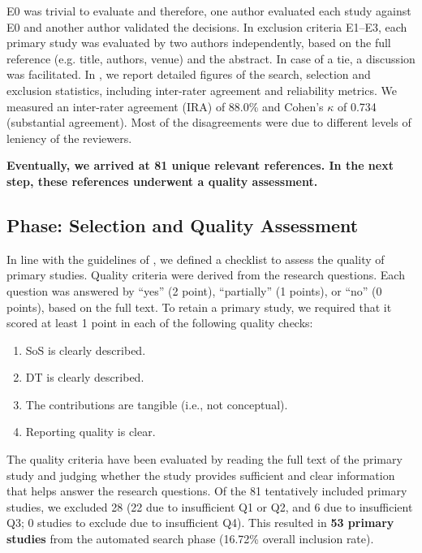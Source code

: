 E0 was trivial to evaluate and therefore, one author evaluated each study against E0 and another author validated the decisions. In exclusion criteria E1--E3, each primary study was evaluated by two authors independently, based on the full reference (e.g. title, authors, venue) and the abstract. In case of a tie, a discussion was facilitated. In , we report detailed figures of the search, selection and exclusion statistics, including inter-rater agreement and reliability metrics.
We measured an inter-rater agreement (IRA) of 88.0\% and Cohen's $\kappa$ of 0.734 (substantial agreement). Most of the disagreements were due to different levels of leniency of the reviewers.

\textbf{Eventually, we arrived at 81 unique relevant references. In the next step, these references underwent a quality assessment.}



\subsection{Phase: Selection and Quality Assessment}\label{subsec:literature-review-study-phases-selection}
In line with the guidelines of \citet{kitchenham2007guidelines}, we defined a checklist to assess the quality of primary studies. Quality criteria were derived from the research questions. Each question was answered by ``yes'' (2 point), ``partially'' (1 points), or ``no'' (0 points), based on the full text. To retain a primary study, we required that it scored at least 1 point in each of the following quality checks:

\begin{enumerate}[\bfseries{Q}1.]
\itemsep0em
    \item SoS is clearly described.
    \item DT is clearly described.
    \item The contributions are tangible (i.e., not conceptual).
    \item Reporting quality is clear.
\end{enumerate}

The quality criteria have been evaluated by reading the full text of the primary study and judging whether the study provides sufficient and clear information that helps answer the research questions. Of the 81 tentatively included primary studies, we excluded 28 (22 due to insufficient Q1 or Q2, and 6 due to insufficient Q3; 0 studies to exclude due to insufficient Q4). This resulted in \textbf{53 primary studies} from the automated search phase (16.72\% overall inclusion rate).

